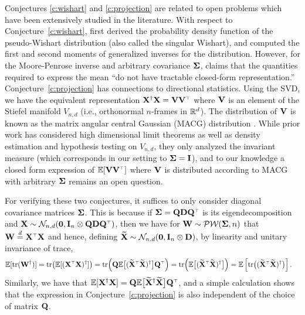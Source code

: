 Conjectures \ref{c:wishart} and \ref{c:projection} are related to open problems
which have been extensively studied in the literature.
With respect to Conjecture~\ref{c:wishart}, \cite{srivastava2003} first derived the probability
density function of the pseudo-Wishart
distribution (also called the singular Wishart), and \cite{cook2011}
computed the first and second moments of 
generalized inverses for the distribution. However, for the
Moore-Penrose inverse and arbitrary covariance $\mathbf{\Sigma}$,
\cite{cook2011} claims that the quantities required
to express the mean ``do not have tractable closed-form representation.''
%
Conjecture~\ref{c:projection} has connections to directional statistics.
Using the SVD, we have the equivalent representation $\X^\dagger \X = \V \V^\top$
where $\mathbf V$ is an element of the Stiefel manifold $V_{n,d}$ (i.e., orthonormal
$n$-frames in $\mathbb R^d$).
The distribution of $\mathbf V$ is known as the matrix angular central
Gaussian (MACG) distribution \citep{chikuse1990matrix}. While prior work
has considered high dimensional limit theorems \citep{CHIKUSE1991145}
as well as density estimation and hypothesis testing \citep{CHIKUSE1998188}
on $V_{n,d}$, they only analyzed the invariant measure
(which corresponds in our setting to $\mathbf{\Sigma} = \mathbf I$),
and to our knowledge a closed form expression of $\E[\V\V^\top]$ where
$\mathbf V$ is distributed according to MACG with
arbitrary $\mathbf{\Sigma}$ remains an open question.

For verifying these two conjectures, it suffices to only consider
diagonal covariance matrices $\mathbf{\Sigma}$.  This is because if $\Sigmab = \Q \D
\Q^\top$ is its eigendecomposition and $\X\sim\Nc_{n,d}(\zero, \I_n \otimes \Q\D\Q^\top)$, then
we have for $\mathbf W \sim \mathcal{P}\mathcal{W}(\mathbf{\Sigma}, n)$ that $\W
\overset{d}{=} \X^\top \X$ and hence, defining
$\widetilde{\mathbf{X}}\sim\mathcal{N}_{n,d}(\mathbf 0,\mathbf I_n \otimes \mathbf D)$, by linearity and unitary invariance of trace,
\begin{align*}
  \E[\tr(\W^\dagger)]
  &= \tr\big( \E[(\X^\top\X)^\dagger] \big)
  = \tr\Big( \Q\E\big[(\Xt^\top\Xt)^\dagger\big]\Q^\top \Big)
  = \tr\Big( \E\big[(\Xt^\top\Xt)^\dagger\big] \Big)
  = \E\left[\tr \big((\Xt^\top\Xt)^\dagger\big) \right].
\end{align*}
Similarly, we have that
$\E[\X^\dagger\X]=\Q\E\big[\Xt^\dagger\Xt\big]\Q^\top$, and a simple
calculation shows that the expression in Conjecture~\ref{c:projection}
is also independent of the choice of matrix $\mathbf Q$.


